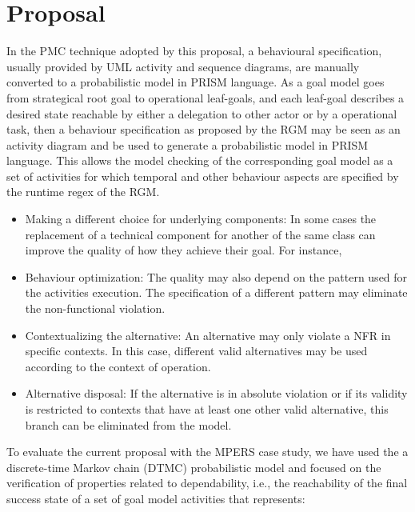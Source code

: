\chapter{Proposal}\label{ch_proposal}

In the PMC technique adopted by this proposal, a behavioural specification, usually provided by UML activity and sequence diagrams, are manually converted to a probabilistic model in PRISM language. As a goal model goes from strategical root goal to operational leaf-goals, and each leaf-goal describes a desired state reachable by either a delegation to other actor or by a operational task, then a behaviour specification as proposed by the RGM may be seen as an activity diagram and be used to generate a probabilistic model in PRISM language. This allows the model checking of the corresponding goal model as a set of activities for which temporal and other behaviour aspects are specified by the runtime regex of the RGM.

\begin{itemize}

\item Making a different choice for underlying components: In some cases the replacement of a technical component for another of the same class can improve the quality of how they achieve their goal. For instance,
\medskip

\item Behaviour optimization: The quality may also depend on the pattern used for the activities execution. The specification of a different pattern may eliminate the non-functional violation. 
\medskip

\item Contextualizing the alternative: An alternative may only violate a NFR in specific contexts. In this case, different valid alternatives may be used according to the context of operation.
\medskip

\item Alternative disposal: If the alternative is in absolute violation or if its validity is restricted to contexts that have at least one other valid alternative, this branch can be eliminated from the model.

\end{itemize}

To evaluate the current proposal with the MPERS case study, we have used the a discrete-time Markov chain (DTMC) probabilistic model and focused on the verification of properties related to dependability, i.e., the reachability of the final success state of a set of goal model activities that represents: 

